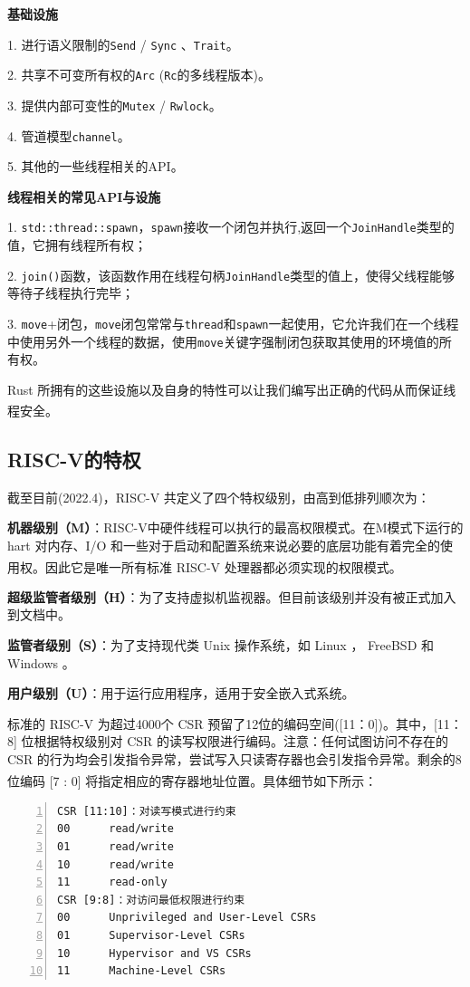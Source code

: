 \documentclass[UTF8,fontset=none,linespread=1.15]{ctexart}
\let\nosupcite\cite
\renewcommand*{\cite}[1]{\textsuperscript{\nosupcite{#1}}}
\begin{document}
\textbf{基础设施}

1. 进行语义限制的\texttt{Send} / \texttt{Sync} 、\texttt{Trait}。

2. 共享不可变所有权的\texttt{Arc} (\texttt{Rc}的多线程版本)。

3. 提供内部可变性的\texttt{Mutex} / \texttt{Rwlock}。

4. 管道模型\texttt{channel}。

5. 其他的一些线程相关的API。

\textbf{线程相关的常见API与设施}

1. \texttt{std::thread::spawn}，\texttt{spawn}接收一个闭包并执行,返回一个\texttt{JoinHandle}类型的值，它拥有线程所有权；

2. \texttt{join()}函数，该函数作用在线程句柄\texttt{JoinHandle}类型的值上，使得父线程能够等待子线程执行完毕；

3. \texttt{move}+闭包，\texttt{move}闭包常常与\texttt{thread}和\texttt{spawn}一起使用，它允许我们在一个线程中使用另外一个线程的数据，使用\texttt{move}关键字强制闭包获取其使用的环境值的所有权。

Rust 所拥有的这些设施以及自身的特性可以让我们编写出正确的代码从而保证线程安全。\cite{9}


\subsection{RISC-V的特权}
截至目前(2022.4)，RISC-V 共定义了四个特权级别，由高到低排列顺次为：

\textbf{机器级别（M）}：RISC-V中硬件线程可以执行的最高权限模式。在M模式下运行的 hart 对内存、I/O 和一些对于启动和配置系统来说必要的底层功能有着完全的使用权。因此它是唯一所有标准 RISC-V 处理器都必须实现的权限模式。\cite{a}

\textbf{超级监管者级别（H）}：为了支持虚拟机监视器。但目前该级别并没有被正式加入到文档中。

\textbf{监管者级别（S）}：为了支持现代类 Unix 操作系统，如 Linux ， FreeBSD 和 Windows 。

\textbf{用户级别（U）}：用于运行应用程序，适用于安全嵌入式系统。

标准的 RISC-V 为超过4000个 CSR 预留了12位的编码空间([11：0])。其中，[11：8] 位根据特权级别对 CSR 的读写权限进行编码。注意：任何试图访问不存在的 CSR 的行为均会引发指令异常，尝试写入只读寄存器也会引发指令异常。剩余的8位编码 [7 :  0] 将指定相应的寄存器地址位置。具体细节如下所示：\cite{b}\cite{c}

\begin{lstlisting}[numbers=left]
CSR [11:10]：对读写模式进行约束
00		read/write
01		read/write
10		read/write
11		read-only
CSR [9:8]：对访问最低权限进行约束
00		Unprivileged and User-Level CSRs
01		Supervisor-Level CSRs
10		Hypervisor and VS CSRs
11		Machine-Level CSRs
\end{lstlisting}
\end{document}
